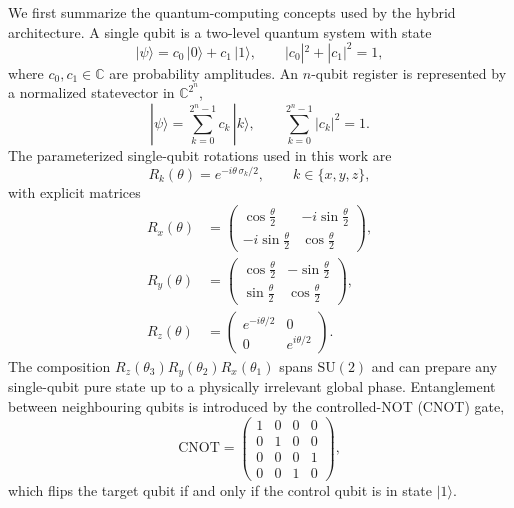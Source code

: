 We first summarize the quantum-computing concepts used by the hybrid architecture. A single qubit is a two-level quantum system with state
\begin{equation}
  |\psi\rangle = c_0\,|0\rangle + c_1\,|1\rangle, \qquad
  |c_0|^2 + |c_1|^2 = 1,
\end{equation}
where $c_0,c_1 \in \mathbb{C}$ are probability amplitudes. An $n$-qubit register is represented by a normalized statevector in $\mathbb{C}^{2^n}$,
\begin{equation}
  |\psi\rangle = \sum_{k=0}^{2^n-1} c_k\,|k\rangle, \qquad
  \sum_{k=0}^{2^n-1} |c_k|^2 = 1.
\end{equation}
The parameterized single-qubit rotations used in this work are
\begin{equation}
  R_k(\theta)=e^{-i\theta\,\sigma_k/2}, \qquad k\in\{x,y,z\},
\end{equation}
with explicit matrices
\begin{equation}
\begin{aligned}
  R_x(\theta) &=
  \begin{pmatrix} \cos\tfrac{\theta}{2} & -i\sin\tfrac{\theta}{2} \\
  -i\sin\tfrac{\theta}{2} & \cos\tfrac{\theta}{2} \end{pmatrix},
  \\
  R_y(\theta) &=
  \begin{pmatrix} \cos\tfrac{\theta}{2} & -\sin\tfrac{\theta}{2} \\
  \sin\tfrac{\theta}{2} & \cos\tfrac{\theta}{2} \end{pmatrix},
  \\
  R_z(\theta) &=
  \begin{pmatrix} e^{-i\theta/2} & 0 \\
  0 & e^{i\theta/2} \end{pmatrix}.
\end{aligned}
\end{equation}
The composition $R_z(\theta_3)R_y(\theta_2)R_x(\theta_1)$ spans $\mathrm{SU}(2)$ and can prepare any single-qubit pure state up to a physically irrelevant global phase. Entanglement between neighbouring qubits is introduced by the controlled-NOT (CNOT) gate,
\begin{equation}
  \mathrm{CNOT} =
  \begin{pmatrix} 1 & 0 & 0 & 0 \\
                  0 & 1 & 0 & 0 \\
                  0 & 0 & 0 & 1 \\
                  0 & 0 & 1 & 0 \end{pmatrix},
\end{equation}
which flips the target qubit if and only if the control qubit is in state $|1\rangle$.

